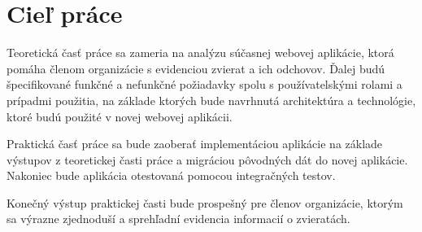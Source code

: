 \chapter{Cieľ práce}

Teoretická časť práce sa zameria na analýzu súčasnej webovej aplikácie, ktorá pomáha členom organizácie s evidenciou zvierat a ich odchovov. Ďalej budú špecifikované funkčné a nefunkčné požiadavky spolu s používatelskými rolami a prípadmi použitia, na základe ktorých bude navrhnutá architektúra a technológie, ktoré budú použité v novej webovej aplikácii. 

Praktická časť práce sa bude zaoberať implementáciou aplikácie na základe výstupov z teoretickej časti práce a migráciou pôvodných dát do novej aplikácie. Nakoniec bude aplikácia otestovaná pomocou integračných testov.

Konečný výstup praktickej časti bude prospešný pre členov organizácie, ktorým sa výrazne zjednoduší a sprehľadní evidencia informacií o zvieratách.